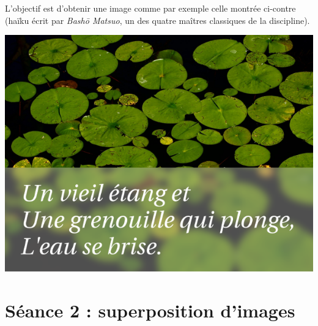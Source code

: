 \begin{minipage}[c]{.48\textwidth}
L'objectif est d'obtenir une image comme par exemple celle montrée ci-contre (haïku écrit par \emph{Bash\={o} Matsuo}, un des quatre maîtres classiques de la discipline).
\end{minipage}\hfill%
\begin{minipage}[c]{.48\textwidth}
\centering%
\includegraphics[angle=0,width=.8\textwidth]{./images/image02/haiku}
\end{minipage}





%
%
%
%


\section{Séance 2 : superposition d'images}\label{ficheImage5e2}


